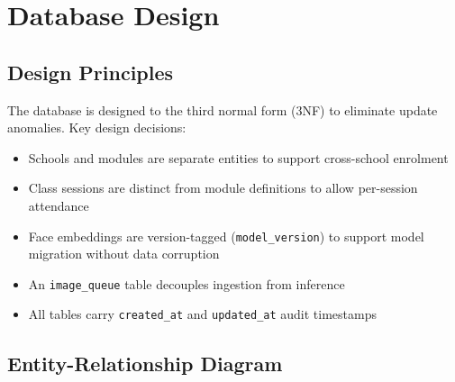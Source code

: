 \documentclass[12pt,a4paper]{report}
\begin{document}
\chapter{Database Design}

\section{Design Principles}
The database is designed to the third normal form (3NF) to eliminate update anomalies. Key design decisions:
\begin{itemize}
  \item Schools and modules are separate entities to support cross-school enrolment
  \item Class sessions are distinct from module definitions to allow per-session attendance
  \item Face embeddings are version-tagged (\texttt{model\_version}) to support model migration without data corruption
  \item An \texttt{image\_queue} table decouples ingestion from inference
  \item All tables carry \texttt{created\_at} and \texttt{updated\_at} audit timestamps
\end{itemize}

\section{Entity-Relationship Diagram}
\end{document}
